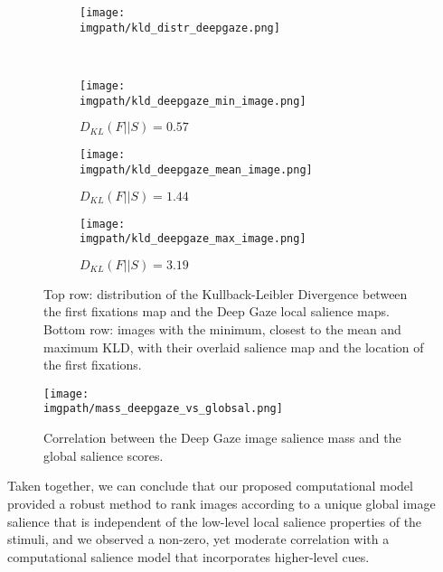 {\begin{figure}[ht]
  \centering
  \begin{subfigure}{0.75 \linewidth}
      \texttt{[image: \\imgpath/kld\_distr\_deepgaze.png]}
      \label{fig:globsal-kld_distr_deepgaze_sub}
  \end{subfigure}
  \\
  \begin{subfigure}{0.3 \linewidth}
      \centering
      \texttt{[image: \\imgpath/kld\_deepgaze\_min\_image.png]}
      \caption{$D_{KL}(F||S) = 0.57$}
    \label{fig:globsal-kld_deepgaze_min_image}
  \end{subfigure}
  \hspace{0.02 \linewidth}
  \begin{subfigure}{0.3 \linewidth}
      \centering
      \texttt{[image: \\imgpath/kld\_deepgaze\_mean\_image.png]}
      \caption{$D_{KL}(F||S) = 1.44$}
    \label{fig:globsal-kld_deepgaze_mean_image}
  \end{subfigure}
  \hspace{0.02 \linewidth}
  \begin{subfigure}{0.3 \linewidth}
      \centering
      \texttt{[image: \\imgpath/kld\_deepgaze\_max\_image.png]}
      \caption{$D_{KL}(F||S) = 3.19$}
    \label{fig:globsal-kld_deepgaze_max_image}
  \end{subfigure}
  \caption{Top row: distribution of the Kullback-Leibler Divergence between the first fixations map and the Deep Gaze local salience maps. Bottom row: images with the minimum, closest to the mean and maximum KLD, with their overlaid salience map and the location of the first fixations.}
  \label{fig:globsal-kld_distr_deepgaze}
\end{figure}

\begin{figure}[ht]
  \centering
  \texttt{[image: \\imgpath/mass\_deepgaze\_vs\_globsal.png]}
  \caption{Correlation between the Deep Gaze image salience mass and the global salience scores.}
\label{fig:globsal-mass_deepgaze_vs_globsal}
\end{figure}

Taken together, we can conclude that our proposed computational model provided a robust method to rank images according to a unique global image salience that is independent of the low-level local salience properties of the stimuli, and we observed a non-zero, yet moderate correlation with a computational salience model that incorporates higher-level cues.

}
